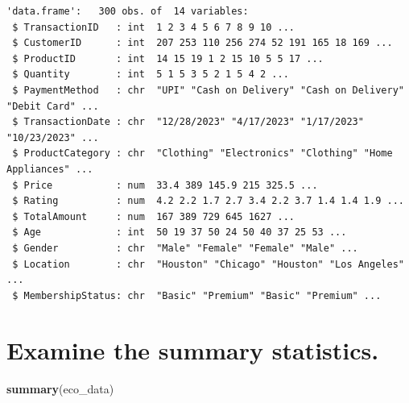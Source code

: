 \documentclass[
]{article}
\newenvironment{Shaded}{\begin{snugshade}}{\end{snugshade}}
\newcommand{\FunctionTok}[1]{\textcolor[rgb]{0.13,0.29,0.53}{\textbf{#1}}}
\newcommand{\NormalTok}[1]{#1}
\begin{document}
\begin{verbatim}
'data.frame':   300 obs. of  14 variables:
 $ TransactionID   : int  1 2 3 4 5 6 7 8 9 10 ...
 $ CustomerID      : int  207 253 110 256 274 52 191 165 18 169 ...
 $ ProductID       : int  14 15 19 1 2 15 10 5 5 17 ...
 $ Quantity        : int  5 1 5 3 5 2 1 5 4 2 ...
 $ PaymentMethod   : chr  "UPI" "Cash on Delivery" "Cash on Delivery" "Debit Card" ...
 $ TransactionDate : chr  "12/28/2023" "4/17/2023" "1/17/2023" "10/23/2023" ...
 $ ProductCategory : chr  "Clothing" "Electronics" "Clothing" "Home Appliances" ...
 $ Price           : num  33.4 389 145.9 215 325.5 ...
 $ Rating          : num  4.2 2.2 1.7 2.7 3.4 2.2 3.7 1.4 1.4 1.9 ...
 $ TotalAmount     : num  167 389 729 645 1627 ...
 $ Age             : int  50 19 37 50 24 50 40 37 25 53 ...
 $ Gender          : chr  "Male" "Female" "Female" "Male" ...
 $ Location        : chr  "Houston" "Chicago" "Houston" "Los Angeles" ...
 $ MembershipStatus: chr  "Basic" "Premium" "Basic" "Premium" ...
\end{verbatim}

\section{Examine the summary
statistics.}\label{examine-the-summary-statistics.}

\begin{Shaded}
\begin{Highlighting}[]
\FunctionTok{summary}\NormalTok{(eco\_data)}
\end{Highlighting}
\end{Shaded}
\end{document}
